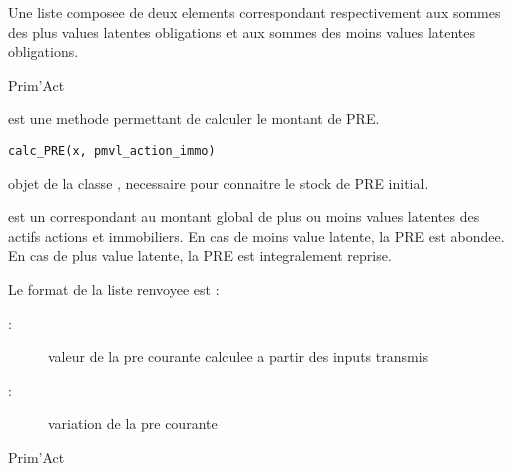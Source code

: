 \documentclass[a4paper]{book}
\begin{document}
%
\begin{Value}
Une liste composee de deux elements  correspondant respectivement 
aux sommes des plus values latentes obligations et aux sommes des moins values latentes obligations.
\end{Value}
%
\begin{Author}\relax
Prim'Act
\end{Author}
%
\begin{Description}\relax
{} est une methode permettant de calculer le montant de PRE.
\end{Description}
%
\begin{Usage}
\begin{verbatim}
calc_PRE(x, pmvl_action_immo)
\end{verbatim}
\end{Usage}
%
\begin{Arguments}
\begin{ldescription}
\item[\code{x}] objet de la classe , necessaire pour connaitre le stock de PRE initial.

\item[\code{pmvl\_action\_immo}] est un  correspondant au montant global de plus ou moins values latentes des actifs actions et immobiliers.
En cas de moins value latente, la PRE est abondee.
En cas de plus value latente, la PRE est integralement reprise.
\end{ldescription}
\end{Arguments}
%
\begin{Value}
Le format de la liste renvoyee est :
\begin{description}

\item[ : ]  valeur de la pre courante calculee a partir des inputs transmis
\item[ : ]  variation de la pre courante

\end{description}

\end{Value}
%
\begin{Author}\relax
Prim'Act
\end{Author}
\end{document}
